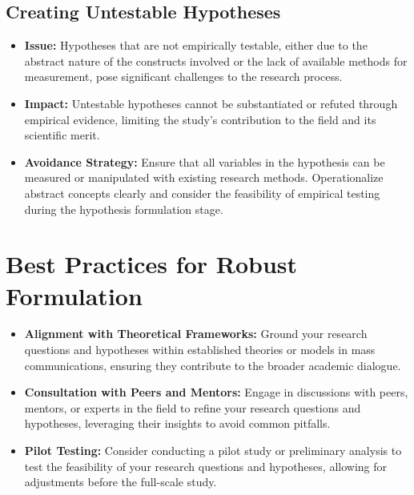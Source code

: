 \documentclass[
]{book}
\begin{document}
\hypertarget{creating-untestable-hypotheses}{%
\subsection*{Creating Untestable Hypotheses}\label{creating-untestable-hypotheses}}

\begin{itemize}
\item
  \textbf{Issue:} Hypotheses that are not empirically testable, either due to the abstract nature of the constructs involved or the lack of available methods for measurement, pose significant challenges to the research process.
\item
  \textbf{Impact:} Untestable hypotheses cannot be substantiated or refuted through empirical evidence, limiting the study's contribution to the field and its scientific merit.
\item
  \textbf{Avoidance Strategy:} Ensure that all variables in the hypothesis can be measured or manipulated with existing research methods. Operationalize abstract concepts clearly and consider the feasibility of empirical testing during the hypothesis formulation stage.
\end{itemize}

\hypertarget{best-practices-for-robust-formulation}{%
\section{Best Practices for Robust Formulation}\label{best-practices-for-robust-formulation}}

\begin{itemize}
\item
  \textbf{Alignment with Theoretical Frameworks:} Ground your research questions and hypotheses within established theories or models in mass communications, ensuring they contribute to the broader academic dialogue.
\item
  \textbf{Consultation with Peers and Mentors:} Engage in discussions with peers, mentors, or experts in the field to refine your research questions and hypotheses, leveraging their insights to avoid common pitfalls.
\item
  \textbf{Pilot Testing:} Consider conducting a pilot study or preliminary analysis to test the feasibility of your research questions and hypotheses, allowing for adjustments before the full-scale study.
\end{itemize}
\end{document}
